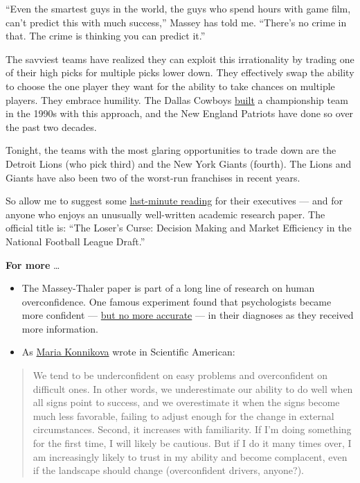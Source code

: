 ``Even the smartest guys in the world, the guys who spend hours with
game film, can't predict this with much success,'' Massey has told me.
``There's no crime in that. The crime is thinking you can predict it.''

The savviest teams have realized they can exploit this irrationality by
trading one of their high picks for multiple picks lower down. They
effectively swap the ability to choose the one player they want for the
ability to take chances on multiple players. They embrace humility. The
Dallas Cowboys
\href{https://www.dallasnews.com/sports/cowboys/2019/10/12/its-been-30-years-since-the-cowboys-traded-herschel-walker-to-the-vikings-fueling-a-dynasty/}{built}
a championship team in the 1990s with this approach, and the New England
Patriots have done so over the past two decades.

Tonight, the teams with the most glaring opportunities to trade down are
the Detroit Lions (who pick third) and the New York Giants (fourth). The
Lions and Giants have also been two of the worst-run franchises in
recent years.

So allow me to suggest some
\href{https://repository.upenn.edu/cgi/viewcontent.cgi?article=1138\&context=oid_papers}{last-minute
reading} for their executives --- and for anyone who enjoys an unusually
well-written academic research paper. The official title is: ``The
Loser's Curse: Decision Making and Market Efficiency in the National
Football League Draft.''

\textbf{For more} \ldots{}

\begin{itemize}
\item
  The Massey-Thaler paper is part of a long line of research on human
  overconfidence. One famous experiment found that psychologists became
  more confident ---
  \href{https://www.nytimes3xbfgragh.onion/2005/04/24/weekinreview/the-nfl-draft-a-study-in-cockeyed-overconfidence.html}{but
  no more accurate} --- in their diagnoses as they received more
  information.
\item
  As
  \href{https://blogs.scientificamerican.com/guest-blog/lessons-from-sherlock-holmes-confidence-is-good-overconfidence-not-so-much/}{Maria
  Konnikova} wrote in Scientific American:
\end{itemize}

\begin{quote}
We tend to be underconfident on easy problems and overconfident on
difficult ones. In other words, we underestimate our ability to do well
when all signs point to success, and we overestimate it when the signs
become much less favorable, failing to adjust enough for the change in
external circumstances. Second, it increases with familiarity. If I'm
doing something for the first time, I will likely be cautious. But if I
do it many times over, I am increasingly likely to trust in my ability
and become complacent, even if the landscape should change
(overconfident drivers, anyone?).
\end{quote}

